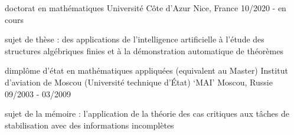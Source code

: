 \begin{cventries}
  \cventry
    {doctorat en mathématiques}
    {Université Côte d'Azur}
    {Nice, France}
    {10/2020 - en cours}
    {
      \begin{cvitems}
        \item {sujet de thèse : des applications de l'intelligence artificielle à l'étude des structures algébriques finies et à la démonstration automatique de théorèmes}
      \end{cvitems}
    }
  \cventry
    {dimplôme d'état en mathématiques appliquées (equivalent au Master)}
    {Institut d'aviation de Moscou (Université technique d'État) `MAI'}
    {Moscou, Russie}
    {09/2003 - 03/2009}
    {
      \begin{cvitems}
        \item {sujet de la mémoire : l'application de la théorie des cas critiques aux tâches de stabilisation avec des informations incomplètes}
      \end{cvitems}
    }
\end{cventries}
